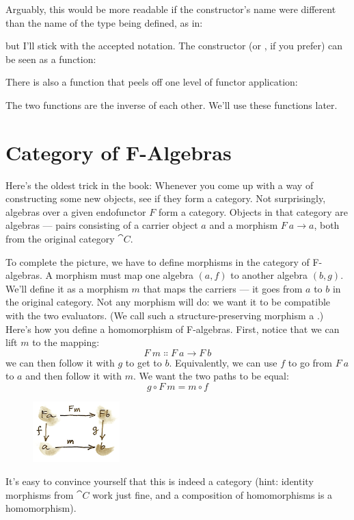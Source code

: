 Arguably, this would be more readable if the constructor's name were
different than the name of the type being defined, as in:

but I'll stick with the accepted notation. The constructor 
(or , if you prefer) can be seen as a function:

There is also a function that peels off one level of functor
application:

The two functions are the inverse of each other. We'll use these
functions later.

\section{Category of F-Algebras}

Here's the oldest trick in the book: Whenever you come up with a way of
constructing some new objects, see if they form a category. Not
surprisingly, algebras over a given endofunctor $F$ form a
category. Objects in that category are algebras --- pairs consisting of
a carrier object $a$ and a morphism
$F\ a \to a$, both from the original category
$\cat{C}$.

To complete the picture, we have to define morphisms in the category of
F-algebras. A morphism must map one algebra $(a, f)$ to another
algebra $(b, g)$. We'll define it as a morphism $m$ that
maps the carriers --- it goes from $a$ to $b$ in the
original category. Not any morphism will do: we want it to be compatible
with the two evaluators. (We call such a structure-preserving morphism a
.) Here's how you define a homomorphism of
F-algebras. First, notice that we can lift $m$ to the mapping:
\[F\ m \Colon F\ a \to F\ b\]
we can then follow it with $g$ to get to $b$.
Equivalently, we can use $f$ to go from $F\ a$ to
$a$ and then follow it with $m$. We want the two paths to
be equal:
\[g \circ F\ m = m \circ f\]

\begin{figure}[H]
\centering
\includegraphics[width=0.3\textwidth]{images/alg.png}
\end{figure}

\noindent
It's easy to convince yourself that this is indeed a category (hint:
identity morphisms from $\cat{C}$ work just fine, and a composition of
homomorphisms is a homomorphism).

